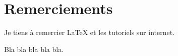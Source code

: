 \section*{Remerciements}

Je tiens à remercier \LaTeX{} et les tutoriels sur internet.

Bla bla bla bla bla.

